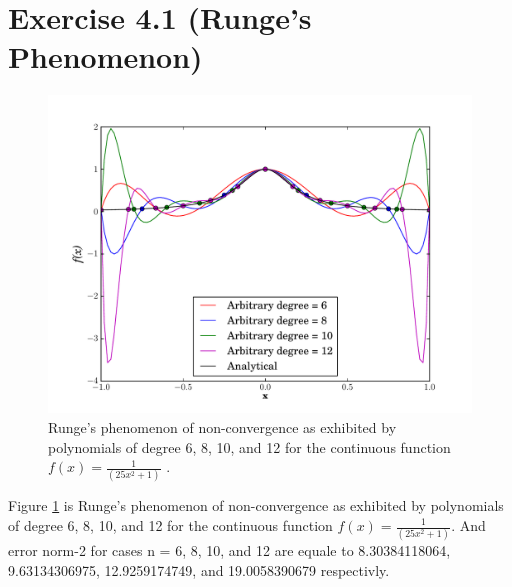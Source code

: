\documentclass[10pt]{article}
\begin{document}
\section{Exercise 4.1 (Runge’s Phenomenon)}

\begin{figure}[h]
  \begin{center}
    \includegraphics[totalheight=0.6\textheight]{plot5.pdf}
    \caption{\label{fig:Interpol} Runge’s phenomenon of non-convergence as exhibited by polynomials of degree 6, 8, 10, and 12 for the continuous function $f(x) = \frac{1}{(25x^2 + 1)}$ .}
  \end{center}
\end{figure}

Figure \ref{fig:Interpol} is Runge’s phenomenon of non-convergence as exhibited by polynomials of degree 6, 8, 10, and 12 for the continuous function $f(x) = \frac{1}{(25x^2 + 1)}$. And error norm-2 for cases n = 6, 8, 10, and 12 are equale to 8.30384118064, 9.63134306975, 12.9259174749, and 19.0058390679 respectivly.\\
  
\end{document}
